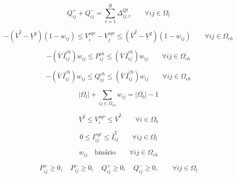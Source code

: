 \begin{tcolorbox}[breakable,pad at break*=1mm,colback=white!10,title =\textbf{Problema de PLIM para RSD}]
\begin{equation*}\label{eq:Lin_modPReativa}
        Q_{ij}^{+} + Q_{ij}^{-} = \sum_{r = 1}^{R}\Delta_{ij,r}^{Ql}  \qquad\forall ij\in\Omega_{l}
\end{equation*}

\begin{equation*}\label{eq:Lin_voltagekeys}
    -(\overline{V}^{2} - \underline{V}^{2})(1-w_{ij}) \leq V_{i}^{sqr} - V_{j}^{sqr} \leq (\overline{V}^{2} - \underline{V}^{2})(1-w_{ij})\qquad\forall ij\in\Omega_{ch}
\end{equation*}
    
\begin{equation*}\label{eq:Lin_PAkeys}
    -(\overline{V}\,\overline{I}_{ij}^{ch})w_{ij} \leq P_{ij}^{ch} \leq (\overline{V}\,\overline{I}_{ij}^{ch})w_{ij}\qquad\forall ij\in\Omega_{ch}
\end{equation*}
    
    
\begin{equation*}\label{eq:Lin_PRkeys}
    -(\overline{V}\,\overline{I}_{ij}^{ch})w_{ij} \leq Q_{ij}^{ch} \leq (\overline{V}\,\overline{I}_{ij}^{ch})w_{ij}\qquad\forall ij\in\Omega_{ch}
\end{equation*}
    
\begin{equation*}\label{eq:Lin_radialidade}
    |\Omega_{l}| + \sum_{ij\in\Omega_{ch}}w_{ij} = |\Omega_{b}| - 1
\end{equation*}

\begin{equation*}\label{eq:Lin_limvoltage}
    \underline{V}^{2} \leq V_{i}^{sqr} \leq \overline{V}^{2}\qquad\forall i \in\Omega_{b}
\end{equation*}

\begin{equation*}\label{eq:Lin_limcurrent}
    0 \leq I_{ij}^{sqr} \leq \overline{I}_{ij}^{2} \qquad\forall ij\in\Omega_{l} 
\end{equation*}

\begin{equation*}\label{eq:Lin_binario}
    w_{ij}\quad\text{binário}\qquad\forall ij \in\Omega_{ch}
\end{equation*}

\begin{equation*}
    P_{ij}^{+} \geq 0,\quad P_{ij}^{-} \geq 0,\quad Q_{ij}^{+} \geq 0,\quad Q_{ij}^{-} \geq 0,\qquad\forall ij \in \Omega_{l}
\end{equation*}
\end{tcolorbox}


